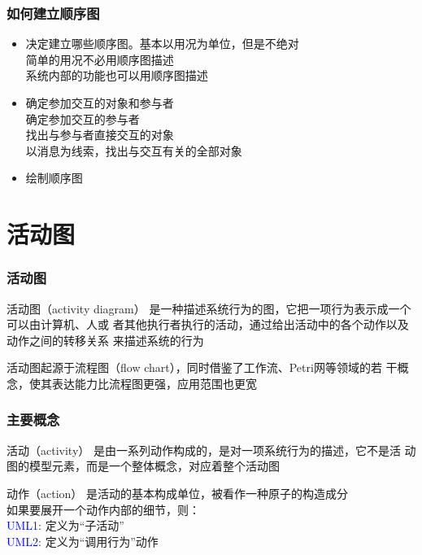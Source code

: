 \documentclass[compress]{beamer}
\begin{document}
\begin{frame}
  \frametitle{如何建立顺序图}
  \begin{itemize}
    \item 决定建立哪些顺序图。基本以用况为单位，但是不绝对 \\
      \quad 简单的用况不必用顺序图描述 \\
      \quad 系统内部的功能也可以用顺序图描述

    \item 确定参加交互的对象和参与者 \\
      \quad 确定参加交互的参与者  \\
      \quad 找出与参与者直接交互的对象  \\
      \quad 以消息为线索，找出与交互有关的全部对象 

    \item 绘制顺序图
  \end{itemize}
\end{frame}

\section{活动图}

\begin{frame}
  \frametitle{活动图}
  \begin{block}{活动图（activity diagram）}
  是一种描述系统行为的图，它把一项行为表示成一个可以由计算机、人或
  者其他执行者执行的活动，通过给出活动中的各个动作以及动作之间的转移关系
  来描述系统的行为
  \end{block}
  活动图起源于流程图（flow chart），同时借鉴了工作流、Petri网等领域的若
  干概念，使其表达能力比流程图更强，应用范围也更宽
\end{frame}

\begin{frame}
  \frametitle{主要概念}
  \begin{block}{活动（activity）}
    是由一系列动作构成的，是对一项系统行为的描述，它不是活
  动图的模型元素，而是一个整体概念，对应着整个活动图
\end{block}
\begin{block} {动作（action）}
  是活动的基本构成单位，被看作一种原子的构造成分 \\
  如果要展开一个动作内部的细节，则： \\
  \quad \textcolor{blue}{UML1}: 定义为“子活动” \\
  \quad \textcolor{blue}{UML2}: 定义为“调用行为”动作
\end{block}

\end{frame}
\end{document}

